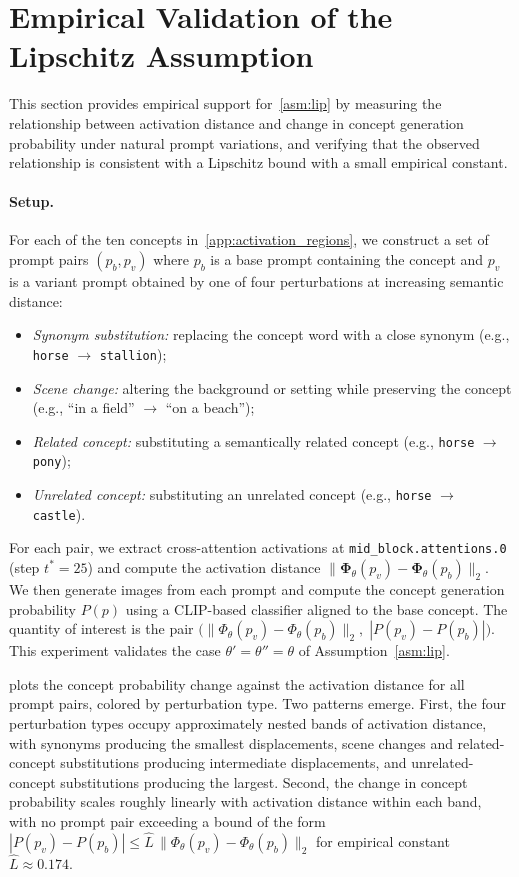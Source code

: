 \section{Empirical Validation of the Lipschitz Assumption}
\label{app:lipschitz}
This section provides empirical support for~\cref{asm:lip} by measuring the relationship between activation distance and change in concept generation probability under natural prompt variations, and verifying that the observed relationship is consistent with a Lipschitz bound with a small empirical constant.

\paragraph{Setup.}
For each of the ten concepts in~\cref{app:activation_regions}, we construct a set of prompt pairs $(p_b, p_v)$ where $p_b$ is a base prompt containing the concept and $p_v$ is a variant prompt obtained by one of four perturbations at increasing semantic distance:
\begin{itemize}
    \item \emph{Synonym substitution:} replacing the concept word with a close synonym (e.g., \texttt{horse} $\to$ \texttt{stallion});
    \item \emph{Scene change:} altering the background or setting while preserving the concept (e.g., ``in a field'' $\to$ ``on a beach'');
    \item \emph{Related concept:} substituting a semantically related concept (e.g., \texttt{horse} $\to$ \texttt{pony});
    \item \emph{Unrelated concept:} substituting an unrelated concept (e.g., \texttt{horse} $\to$ \texttt{castle}).
\end{itemize}
For each pair, we extract cross-attention activations at \texttt{mid\_block.attentions.0} (step $t^*{=}25$) and compute the activation distance $\|\boldsymbol{\Phi}_\theta(p_v) - \boldsymbol{\Phi}_\theta(p_b)\|_2$. We then generate images from each prompt and compute the concept generation probability $P(p)$ using a CLIP-based classifier aligned to the base concept. The quantity of interest is the pair $\bigl(\|\Phi_\theta(p_v) - \Phi_\theta(p_b)\|_2,\;|P(p_v) - P(p_b)|\bigr)$. This experiment validates the case $\theta'=\theta''=\theta$ of Assumption~\ref{asm:lip}.

 plots the concept probability change against the activation distance for all prompt pairs, colored by perturbation type. Two patterns emerge. First, the four perturbation types occupy approximately nested bands of activation distance, with synonyms producing the smallest displacements, scene changes and related-concept substitutions producing intermediate displacements, and unrelated-concept substitutions producing the largest. Second, the change in concept probability scales roughly linearly with activation distance within each band, with no prompt pair exceeding a bound of the form $|P(p_v) - P(p_b)| \leq \hat{L} \,\|\Phi_\theta(p_v) - \Phi_\theta(p_b)\|_2$ for empirical constant $\hat{L} \approx 0.174$.

